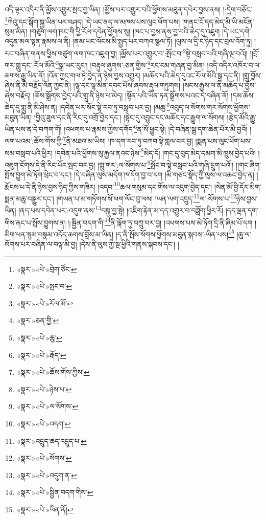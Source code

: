 འདི་ལྟར་འདིར་ནི་མྱོས་འགྱུར་སྤང་བྱ་ཡིན། །མྱོས་པར་འགྱུར་བའི་ཕྱོགས་མཐུན་དཔེར་བྱས་ནས། །:དྲེག་བཅོང་\footnote{«སྣར་»«པེ་»བྲེག་ཙོང་}ཀེའུ་དང་སྒོག་སྐྱ་ཡིན་པར་བཤད། །དེ་ཡང་ནད་ལ་མཁས་པས་ལུང་ཕོག་པས། །གནང་ངོ་དད་མེད་མི་ཡི་མངོན་སུམ་མིན། །གཙུག་ལག་ཁང་གི་ཕྱི་རོལ་དབེན་ཕྱོགས་སུ། །ཁང་པ་བྱས་ནས་བྱ་བའི་ཆེད་དུ་འཇུག །དེ་ཡང་དགེ་འདུན་མལ་སྟན་རྣམས་ལ་ནི། །ནམ་ཡང་ལོངས་མི་སྤྱད་པར་བཀའ་སྩལ་ཏོ། །ལུས་ལ་དྲི་ང་ཉིད་དང་བྲལ་འོག་ཏུ། །རང་བཞིན་གནས་ཕྱིས་གཙུག་ལག་ཁང་འཇུག་བྱ། །མྱོས་པར་འགྱུར་བ་:སྤོང་བ་\footnote{«སྣར་»«པེ་»སྤང་བ་}སྟེ་བསླབ་པའི་གཞི་ལྔ་བའོ།། །།བྲོ་གར་གླུ་དང་:རོལ་མོའི་\footnote{«སྣར་»«པེ་»རོལ་མོ་}སྒྲ་ཡང་རུང་། །བརྟུལ་ཞུགས་:ཅན་གྱིས་\footnote{«སྣར་»ཅན་གྱི་}རང་ངམ་གཞན་བྱ་མིན། །འདི་འདིར་འཁོར་བ་ལ་ཆགས་རྒྱུ་ཡིན་ནོ། །འོན་ཀྱང་གལ་ཏེ་བྱེད་ན་ཉེས་བྱས་འགྱུར། །མཆོད་པའི་ཆེད་དུའང་རོལ་མོའི་སྒྲ་དང་ནི། །གླུ་བྱོས་ཞེས་ནི་མི་བརྗོད་འོན་ཀྱང་ནི། །ལྷ་དང་ལྷ་མིན་དབང་པོས་ཞབས་རྡུལ་གཏུགས། །སངས་རྒྱས་ལ་ནི་མཆོད་པ་བྱོས་ཞེས་བརྗོད། །ཆོས་སྒྲོགས་བྱེད་པའི་གླུ་ནི་ཉེས་པ་མེད། །སྟོན་པའི་ཡོན་ཏན་སྒྲོགས་པའང་དེ་བཞིན་ནོ། །དམ་ཆོས་ཆེད་དུ་གླུ་ནི་མི་ཤེས་ན། །དབེན་པར་སོང་སྟེ་རབ་ཏུ་བསླབ་པར་བྱ། །མཆུ་\footnote{«སྣར་»«པེ་»ཆུ་}འབུད་ལ་སོགས་གར་སོགས་ཕྱོགས་མཐུན་ཡིན། །བྱིའུ་ཟུལ་དང་ནི་རིང་དུ་འགྲོ་བྱེད་དང་། །སྟེང་དུ་འབྱུང་དང་མཆོང་དང་རྒྱུག་ལ་སོགས། །རྩེད་མོའི་རྒྱུ་ཡིན་པས་ན་དེ་བཀག་གོ། །འཕགས་པ་རྣམས་ཀྱིས་དགོད་\footnote{«སྣར་»«པེ་»རྒོད་}ན་སོ་ཕྱུང་སྟེ། །དེ་བཞིན་སྒྲ་དག་ཆེན་པོར་མི་བྱའོ། །ལག་པའམ་:ཆོས་གོས་ཀྱི་\footnote{«སྣར་»«པེ་»ཆོས་གོས་ཀྱིས་}ནི་མཐའ་མ་ཡིས། །ཁ་དག་རབ་ཏུ་བཀབ་སྟེ་གླལ་བར་བྱ། །སྨན་པས་ལུང་ཕོག་པས་སམ་བསླབ་པའི་ཕྱིར། །དབེན་པའི་ཕྱོགས་སུ་རྐྱལ་ནའང་ཉེས་\footnote{«སྣར་»«པེ་»ཉེས་པ་}མེད་དོ། །གང་དུ་བུད་མེད་དམག་མི་ཁྲུས་བྱེད་པའི། །འཇུག་ངོགས་དེ་ནི་རིང་པོར་སྤང་བར་བྱ། །གླུ་གར་:ལ་སོགས་པ་\footnote{«སྣར་»«པེ་»ལ་སོགས་}སྤོང་བ་སྟེ་བསླབ་པའི་གཞི་དྲུག་པའོ།། །།གང་ཞིག་སྤོས་བྱུག་མེ་ཏོག་ཕྲེང་བ་དང་། །དེ་བཞིན་ལུས་མདོག་ཁ་དོག་བྱ་བ་དག །མི་གཙང་སྣོད་ཀྱི་ལུས་ལ་འཆང་བྱེད་ན། །རྨོངས་པ་དེ་ནི་ཉེས་བྱས་ཉིད་ཀྱིས་གཟིར། །འདབ་\footnote{«སྣར་»«པེ་»འདག་}ཆལ་གསུམ་དང་གོས་ལ་འདུག་བྱེད་དང་། །སེན་མོ་བྱི་དོར་མིག་སྨན་མཆུ་བསྒྱུར་དང་། །གཡན་པ་མ་གཏོགས་སོ་ཕག་ལོང་བུ་ལས། །ཡན་ལག་འདྲུད་\footnote{«སྣར་»འདྲུད་ཆད་འདྲུད་པ་}ལ་:སོགས་པ་\footnote{«སྣར་»«པེ་»སོགས་}ཉེས་བྱས་ཡིན། །ནད་པས་དབེན་པར་:འདུག་ནས་\footnote{«སྣར་»«པེ་»འདུག་ན་}བསྐུ་བྱ་སྟེ། །འཇིག་རྟེན་མ་དད་འགྱུར་བ་བཟློག་ཕྱིར་རོ། །དད་ལྡན་དག་གིས་རྐང་པ་སྤོས་བྱུགས་ན། །:སྦྱིན་བདག་གི་\footnote{«སྣར་»«པེ་»སྦྱིན་བདག་གིས་}ནི་ལྐོག་ཏུ་བཀྲུ་བར་བྱ། །འཕགས་པས་མེ་ཏོག་དྲི་ནི་ཞིམ་པོ་དག །མིག་ཕན་སྙམ་བསྣམ་འདོད་ཆགས་བློས་མ་ཡིན། །ད་ནི་སྤོས་སོགས་ཕྱོགས་མཐུན་སྐབས་:ཡིན་པས།\footnote{«སྣར་»«པེ་»ཡིན་ནོ།} །ཆུ་ལ་སོགས་པར་བཞིན་ལ་བལྟ་མི་བྱ། །དེས་ནི་ལུས་ཀྱི་སྔ་ཕྱིའི་གནས་སྐབས་དང་། །
